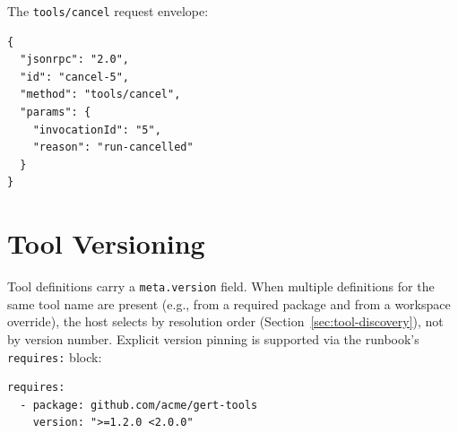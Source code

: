 The \texttt{tools/cancel} request envelope:

\begin{verbatim}
{
  "jsonrpc": "2.0",
  "id": "cancel-5",
  "method": "tools/cancel",
  "params": {
    "invocationId": "5",
    "reason": "run-cancelled"
  }
}
\end{verbatim}

\section{Tool Versioning}
\label{sec:tool-versioning}

Tool definitions carry a \texttt{meta.version} field.  When multiple
definitions for the same tool name are present (e.g., from a required package
and from a workspace override), the host selects by resolution order
(Section~\ref{sec:tool-discovery}), not by version number.  Explicit version
pinning is supported via the runbook's \texttt{requires:} block:

\begin{verbatim}
requires:
  - package: github.com/acme/gert-tools
    version: ">=1.2.0 <2.0.0"
\end{verbatim}
